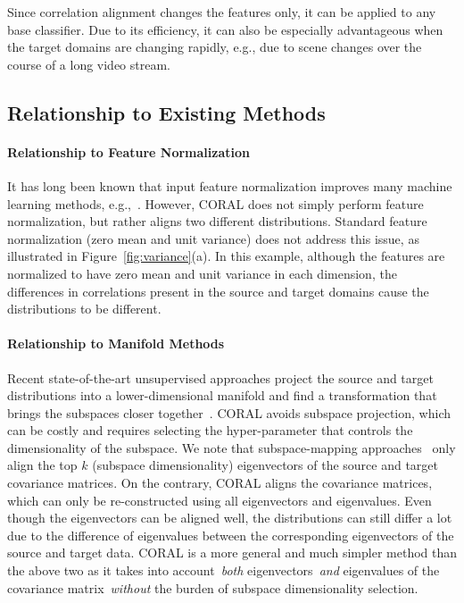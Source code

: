 \documentclass[letterpaper]{article}
\begin{document}
Since correlation alignment changes the features only, it can be applied to any base classifier. Due to its efficiency, it can also be especially advantageous when the target domains are changing rapidly, e.g., due to scene changes over the course of a long video stream. 

\subsection{Relationship to Existing Methods}
\paragraph{Relationship to Feature Normalization} 
It has long been known that input feature normalization improves many machine learning methods, e.g.,~\cite{batchnorm}. However, CORAL does not simply perform feature normalization, but rather aligns two different distributions. Standard feature normalization (zero mean and unit variance) does not address this issue, as illustrated in Figure~\ref{fig:variance}(a). In this example, although the features are normalized to have zero mean and unit variance in each dimension, the differences in correlations present in the source and target domains cause the distributions to be different. 

\paragraph{Relationship to Manifold Methods} 
 Recent state-of-the-art unsupervised approaches project the source and target distributions into a lower-dimensional manifold and find a transformation that brings the subspaces closer together~\cite{gopalan-iccv11,gfk,sasb,outlooks}. CORAL avoids subspace projection, which can be costly and requires selecting the hyper-parameter that controls the dimensionality of the subspace. We note that subspace-mapping approaches~\cite{outlooks,sasb} only align the top $k$ (subspace dimensionality) eigenvectors of the source and target covariance matrices. On the contrary, CORAL aligns the covariance matrices, which can only be re-constructed using all eigenvectors and eigenvalues. Even though the eigenvectors can be aligned well, the distributions can still differ a lot due to the difference of eigenvalues between the corresponding eigenvectors of the source and target data. CORAL is a more general and much simpler method than the above two as it takes into account~\emph{both} eigenvectors~\emph{and} eigenvalues of the covariance matrix~\emph{without} the burden of subspace dimensionality selection. 
\end{document}

